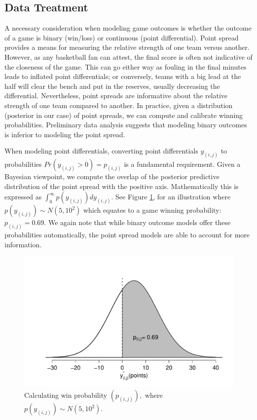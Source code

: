 \documentclass[letterpaper,12pt]{article}
\begin{document}
\subsection{Data Treatment}
A necessary consideration when modeling game outcomes is whether the outcome of a game is binary (win/loss) or continuous (point differential). Point spread provides a means for measuring the relative strength of one team versus another. However, as any basketball fan can attest, the final score is often not indicative of the closeness of the game. This can go either way as fouling in the final minutes leads to inflated point differentials; or conversely, teams with a big lead at the half will clear the bench and put in the reserves,  usually decreasing the differential. Nevertheless, point spreads are informative about the relative strength of one team compared to another. In practice, given a distribution (posterior in our case) of point spreads, we can compute and calibrate winning probabilities. Preliminary data analysis suggests that modeling binary outcomes is inferior to modeling the point spread. 

When modeling point differentials, converting point differentials $y_{(i,j)}$ to probabilities $Pr(y_{(i,j)}>0)=p_{(i,j)}$ is a fundamental requirement. Given a Bayesian viewpoint, we compute the overlap of the posterior predictive distribution of the point spread with the positive axis. Mathematically this is expressed as $\int_0^\infty p(y_{(i,j)})dy_{(i,j)}$. See Figure \ref{fig:winprob}, for an illustration where  $p(y_{(i,j)}) \sim N(5,10^2)$ which equates to a game winning probability: $p_{(i,j)}=0.69$.
We again note that while binary outcome models offer these probabilities automatically, the point spread models are able to account for more information. 
\begin{figure}[h!]
\centering
\includegraphics[width=.7\textwidth]{WinProb2.pdf}
\caption{Calculating win probability $(p_{(i,j)}),$ where $p(y_{(i,j)}) \sim N(5,10^2)$.}
\label{fig:winprob}
\end{figure} 
\end{document}
